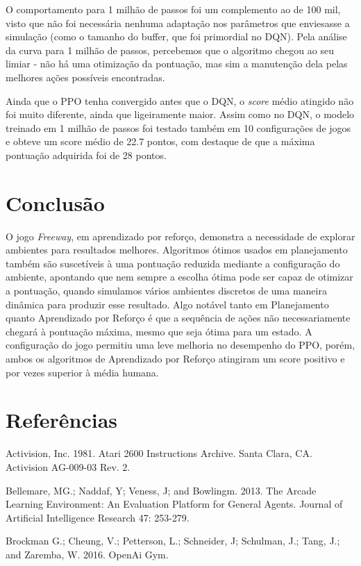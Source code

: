 \documentclass[letterpaper]{article} %
\begin{document}
O comportamento para 1 milhão de passos foi um complemento ao de 100 mil, visto que não foi necessária nenhuma adaptação nos parâmetros que enviesasse a simulação (como o tamanho do buffer, que foi primordial no DQN). Pela análise da curva para 1 milhão de passos, percebemos que o algoritmo chegou ao seu limiar - não há uma otimização da pontuação, mas sim a manutenção dela pelas melhores ações possíveis encontradas.

Ainda que o PPO tenha convergido antes que o DQN, o \textit{score} médio atingido não foi muito diferente, ainda que ligeiramente maior. Assim como no DQN, o modelo treinado em 1 milhão de passos foi testado também em 10 configurações de jogos e obteve um score médio de 22.7 pontos, com destaque de que a máxima pontuação adquirida foi de 28 pontos.


\section{Conclusão}
O jogo \textit{Freeway}, em aprendizado por reforço, demonstra a necessidade de explorar ambientes para resultados melhores. Algoritmos ótimos usados em planejamento também são suscetíveis à uma pontuação reduzida mediante a configuração do ambiente, apontando que nem sempre a escolha ótima pode ser capaz de otimizar a pontuação, quando simulamos vários ambientes discretos de uma maneira dinâmica para produzir esse resultado. Algo notável tanto em Planejamento quanto Aprendizado por Reforço é que a sequência de ações não necessariamente chegará à pontuação máxima, mesmo que seja ótima para um estado. A configuração do jogo permitiu uma leve melhoria no desempenho do PPO, porém, ambos os algoritmos de Aprendizado por Reforço atingiram um score positivo e por vezes superior à média humana.


\section{Referências}
\smallskip \noindent
Activision, Inc. 1981. Atari 2600 Instructions Archive. Santa Clara, CA. Activision AG-009-03 Rev. 2.

\smallskip \noindent
Bellemare, MG.; Naddaf, Y; Veness, J; and Bowlingm. 2013. The Arcade Learning Environment: An Evaluation Platform for General Agents. Journal of Artificial Intelligence Research 47: 253-279.

\smallskip \noindent
Brockman G.; Cheung, V.; Petterson, L.; Schneider, J; Schulman, J.; Tang, J.; and Zaremba, W. 2016. OpenAi Gym.
\end{document}
